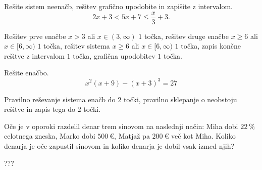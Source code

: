 \documentclass[addpoints]{exam}
\begin{document}
\begin{questions}

    \question[6]
    Rešite sistem neenačb, rešitev grafično upodobite in zapišite z intervalom.
    $$2x+3<5x+7\leq \dfrac{x}{3}+3.$$
    
    
    \begin{solution}[6cm]
        Rešitev prve enačbe $x>3$ ali $x\in(3,\infty)$ $1$ točka, rešitev druge enačbe $x\geq 6$ ali $x\in[6,\infty)$ $1$ točka, rešitev sistema $x\geq 6$ ali $x\in[6,\infty)$ $1$ točka, zapis končne rešitve z intervalom $1$ točka, grafična upodobitev $1$ točka.
    \end{solution}

    \newpage

    \question[3]
    Rešite enačbo.
    $$ x^2(x+9)-(x+3)^3=27 $$
    
    
    \begin{solution}[12cm]
        Pravilno reševanje sistema enačb do $2$ točki, pravilno sklepanje o neobstoju rešitve in zapis tega do $2$ točki.
    \end{solution}



    \question[4]
    Oče je v oporoki razdelil denar trem sinovom na naslednji način:
    Miha dobi $22~\%$ celotnega zneska, Marko dobi $500~€$, Matjaž pa $200~€$ več kot Miha.
    Koliko denarja je oče zapustil sinovom in koliko denarja je dobil vsak izmed njih?
    
    \begin{solution}[6cm]
        ???
    \end{solution}


\newpage


    
    
    
    




\end{questions}
\end{document}
